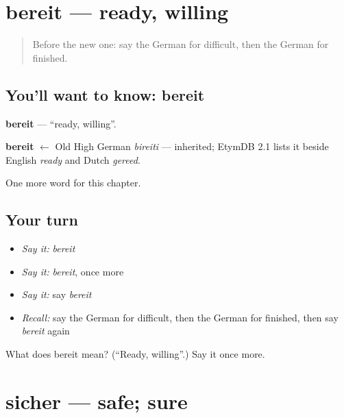 \section[bereit]{bereit — ready, willing}

\label{lesson:GE-C134-bereit}



\begin{quote}
Before the new one: say the German for difficult, then the German for finished.
\end{quote}

\subsection*{You'll want to know: bereit}
\textbf{bereit} — \textquotedblleft{}ready, willing\textquotedblright{}.

\begin{cousinweb}
\textbf{bereit} $\leftarrow$ Old High German \emph{bireiti} — inherited; EtymDB 2.1 lists it beside English \emph{ready} and Dutch \emph{gereed}.
\end{cousinweb}

\begin{grammarlens}[title={What you've built}]
One more word for this chapter.
\end{grammarlens}

\subsection*{Your turn}
\begin{itemize}
\raggedright
  \item \emph{Say it:} \emph{bereit}
  \item \emph{Say it:} \emph{bereit}, once more
  \item \emph{Say it:} say \emph{bereit}
  \item \emph{Recall:} say the German for difficult, then the German for finished, then say \emph{bereit} again
\end{itemize}

\begin{tcolorbox}[breakable,colback=teal!4,colframe=teal!35!black,title={Before you move on}]
What does bereit mean? (\textquotedblleft{}Ready, willing\textquotedblright{}.) Say it once more.
\end{tcolorbox}
\section[sicher]{sicher — safe; sure}

